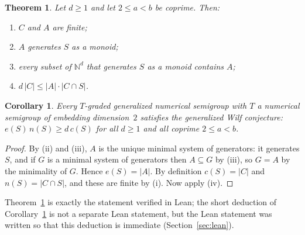 \documentclass[11pt]{article}
\newtheorem{theorem}{Theorem}
\newtheorem{corollary}{Corollary}
\theoremstyle{definition}
\theoremstyle{remark}
\newcommand{\N}{\mathbb N}
\begin{document}
\begin{theorem}\label{thm:main}
Let $d\ge1$ and let $2\le a<b$ be coprime. Then:
\begin{enumerate}
\item[(i)] $C$ and $A$ are finite;
\item[(ii)] $A$ generates $S$ as a monoid;
\item[(iii)] every subset of $\N^d$ that generates $S$ as a monoid contains $A$;
\item[(iv)] $d\,|C|\le |A|\cdot|C\cap S|$.
\end{enumerate}
\end{theorem}

\begin{corollary}\label{cor:wilf}
Every $T$-graded generalized numerical semigroup with $T$ a numerical semigroup
of embedding dimension~$2$ satisfies the generalized Wilf conjecture:
$e(S)\,n(S)\ge d\,c(S)$ for all $d\ge1$ and all coprime $2\le a<b$.
\end{corollary}

\begin{proof}
By (ii) and (iii), $A$ is the unique minimal system of generators: it generates
$S$, and if $G$ is a minimal system of generators then $A\subseteq G$ by (iii),
so $G=A$ by the minimality of $G$. Hence $e(S)=|A|$. By definition $c(S)=|C|$
and $n(S)=|C\cap S|$, and these are finite by (i). Now apply (iv).
\end{proof}

Theorem~\ref{thm:main} is exactly the statement verified in Lean; the short deduction of Corollary~\ref{cor:wilf} is
not a separate Lean statement, but the Lean statement was written so that this
deduction is immediate (Section~\ref{sec:lean}).
\end{document}
